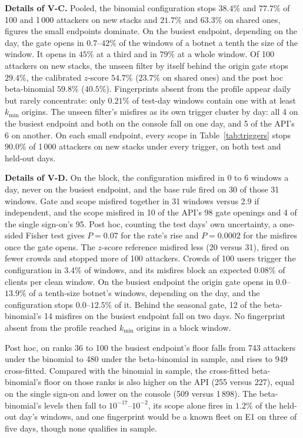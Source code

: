 \documentclass[conference,letterpaper,10pt]{IEEEtran}
\newcommand\1{\textit{(i)}}
\newcommand\2{\textit{(ii)}}
\newcommand\3{\textit{(iii)}}
\newcommand\4{\textit{(iv)}}
\newcommand\5{\textit{(v)}}
\newcommand\6{\textit{(vi)}}
\newcommand\7{\textit{(vii)}}
\newcommand\8{\textit{(viii)}}
\newcommand\9{\textit{(ix)}}
\begin{document}
\textbf{Details of V-C.} Pooled, the binomial configuration stops $38.4\%$ and $77.7\%$ of 100 and 1\,000 attackers on new stacks and $21.7\%$ and $63.3\%$ on shared ones, figures the small endpoints dominate. On the busiest endpoint, depending on the day, the gate opens in $0.7$--$42\%$ of the windows of a botnet a tenth the size of the window. It opens in $45\%$ at a third and in $79\%$ at a whole window. Of 100 attackers on new stacks, the unseen filter by itself behind the origin gate stops $29.4\%$, the calibrated $z$-score $54.7\%$ ($23.7\%$ on shared ones) and the post hoc beta-binomial $59.8\%$ ($40.5\%$). Fingerprints absent from the profile appear daily but rarely concentrate: only $0.21\%$ of test-day windows contain one with at least $k_{\min}$ origins. The unseen filter's misfires as its own trigger cluster by day: all 4 on the busiest endpoint and both on the console fall on one day, and 5 of the API's 6 on another. On each small endpoint, every scope in Table~\ref{tab:triggers} stops $90.0\%$ of 1\,000 attackers on new stacks under every trigger, on both test and held-out days.

\textbf{Details of V-D.} On the block, the configuration misfired in 0 to 6 windows a day, never on the busiest endpoint, and the base rule fired on 30 of those 31 windows. Gate and scope misfired together in 31 windows versus 2.9 if independent, and the scope misfired in 10 of the API's 98 gate openings and 4 of the single sign-on's 95. Post hoc, counting the test days' own uncertainty, a one-sided Fisher test gives $P = 0.07$ for the rate's rise and $P = 0.0002$ for the misfires once the gate opens. The $z$-score reference misfired less (20 versus 31), fired on fewer crowds and stopped more of 100 attackers. Crowds of 100 users trigger the configuration in $3.4\%$ of windows, and its misfires block an expected $0.08\%$ of clients per clean window. On the busiest endpoint the origin gate opens in $0.0$--$13.9\%$ of a tenth-size botnet's windows, depending on the day, and the configuration stops $0.0$--$12.5\%$ of it. Behind the seasonal gate, 12 of the beta-binomial's 14 misfires on the busiest endpoint fall on two days. No fingerprint absent from the profile reached $k_{\min}$ origins in a block window.

Post hoc, on ranks 36 to 100 the busiest endpoint's floor falls from 743 attackers under the binomial to 480 under the beta-binomial in sample, and rises to 949 cross-fitted. Compared with the binomial in sample, the cross-fitted beta-binomial's floor on those ranks is also higher on the API (255 versus 227), equal on the single sign-on and lower on the console (509 versus 1\,898). The beta-binomial's levels then fall to $10^{-17}$--$10^{-2}$, its scope alone fires in $1.2\%$ of the held-out day's windows, and one fingerprint would be a known fleet on E1 on three of five days, though none qualifies in sample.
\end{document}

